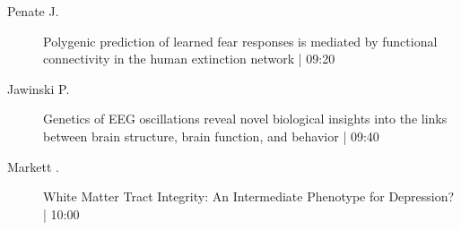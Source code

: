 \begin{symposium}
\begin{description}
                \item [ Penate J.] Polygenic prediction of learned fear responses is mediated by functional connectivity in the human extinction network \textcolor{mygray}{ | 09:20}    
                
                \item [ Jawinski P.] Genetics of EEG oscillations reveal novel biological insights into the links between brain structure, brain function, and behavior \textcolor{mygray}{ | 09:40}    
                
                \item [ Markett  .] White Matter Tract Integrity: An Intermediate Phenotype for Depression? \textcolor{mygray}{ | 10:00}    
                
            \end{description} 
            \end{symposium}
            